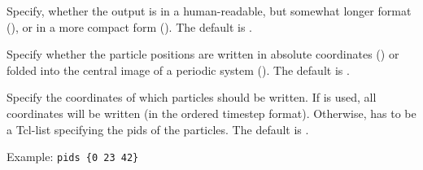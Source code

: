 \begin{arguments}
\item[\opt{<short|verbose>}] Specify, whether the output is in a
  human-readable, but somewhat longer format (), or
  in a more compact form (). The default is
  .
  
\item[\opt{<folded|absolute>}] Specify whether the particle positions
  are written in absolute coordinates () or folded
  into the central image of a periodic system (). The
  default is .
  
\item[\opt{pids <\var{pids}|all>}] Specify the coordinates of which
  particles should be written. If  is used, all
  coordinates will be written (in the ordered timestep format).
  Otherwise,  has to be a Tcl-list specifying the pids of
  the particles. The default is .
  
  Example: \verb!pids {0 23 42}!
  
\end{arguments}


